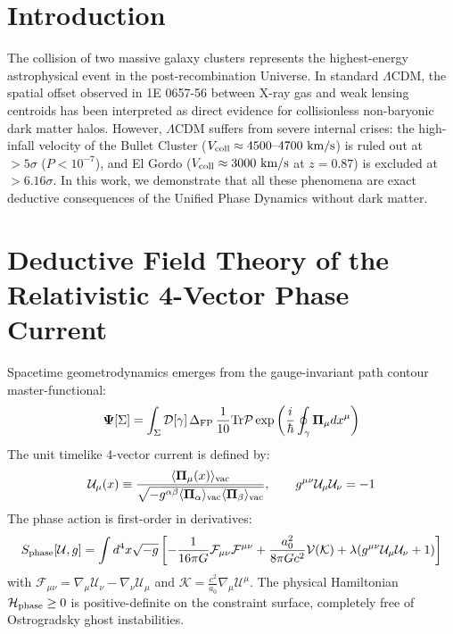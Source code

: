 \documentclass[11pt,a4paper]{article}
\begin{document}
\section{Introduction}
The collision of two massive galaxy clusters represents the highest-energy astrophysical event in the post-recombination Universe. In standard $\Lambda\text{CDM}$, the spatial offset observed in 1E 0657-56 between X-ray gas and weak lensing centroids has been interpreted as direct evidence for collisionless non-baryonic dark matter halos. However, $\Lambda\text{CDM}$ suffers from severe internal crises: the high-infall velocity of the Bullet Cluster ($V_{\rm coll} \approx 4500\text{--}4700\text{ km/s}$) is ruled out at $> 5\sigma$ ($P < 10^{-7}$), and El Gordo ($V_{\rm coll} \approx 3000\text{ km/s}$ at $z = 0.87$) is excluded at $> 6.16\sigma$. In this work, we demonstrate that all these phenomena are exact deductive consequences of the Unified Phase Dynamics without dark matter.

\section{Deductive Field Theory of the Relativistic 4-Vector Phase Current}
Spacetime geometrodynamics emerges from the gauge-invariant path contour master-functional:
\begin{equation}
\mathbf{\Psi}[\Sigma] = \int_{\Sigma} \mathcal{D}[\gamma] \, \Delta_{\rm FP} \, \frac{1}{10} \text{Tr} \mathcal{P} \exp\left( \frac{i}{\hbar} \oint_{\gamma} \mathbf{\Pi}_\mu dx^\mu \right)
\end{equation}
The unit timelike 4-vector current is defined by:
\begin{equation}
\mathcal{U}_\mu(x) \equiv \frac{\langle \mathbf{\Pi}_\mu(x) \rangle_{\rm vac}}{\sqrt{- g^{\alpha\beta} \langle \mathbf{\Pi}_\alpha \rangle_{\rm vac} \langle \mathbf{\Pi}_\beta \rangle_{\rm vac}}}, \qquad g^{\mu\nu}\mathcal{U}_\mu\mathcal{U}_\nu = -1
\end{equation}
The phase action is first-order in derivatives:
\begin{equation}
S_{\rm phase}[\mathcal{U}, g] = \int d^4x \sqrt{-g} \left[ -\frac{1}{16\pi G} \mathcal{F}_{\mu\nu} \mathcal{F}^{\mu\nu} + \frac{a_0^2}{8\pi G c^2} \mathcal{V}(\mathcal{K}) + \lambda (g^{\mu\nu} \mathcal{U}_\mu \mathcal{U}_\nu + 1) \right]
\end{equation}
with $\mathcal{F}_{\mu\nu} = \nabla_\mu \mathcal{U}_\nu - \nabla_\nu \mathcal{U}_\mu$ and $\mathcal{K} = \frac{c^2}{a_0}\nabla_\mu \mathcal{U}^\mu$. The physical Hamiltonian $\mathcal{H}_{\rm phase} \ge 0$ is positive-definite on the constraint surface, completely free of Ostrogradsky ghost instabilities.
\end{document}
